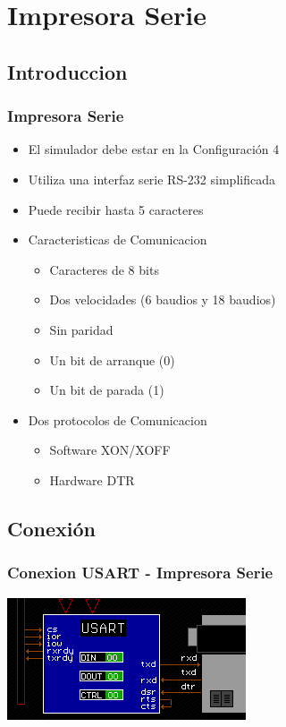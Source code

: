 \documentclass{beamer}
\begin{document}
\section{Impresora Serie}
\subsection{Introduccion}
\begin{frame}[fragile]
\frametitle{Impresora Serie}
\begin{itemize}
 \item El simulador debe estar en la Configuración 4
 \item Utiliza una interfaz serie RS-232 simplificada
 \item Puede recibir hasta 5 caracteres
 \item Caracteristicas de Comunicacion
 \begin{itemize}
  \item Caracteres de 8 bits
  \item Dos velocidades (6 baudios y 18 baudios)
  \item Sin paridad
  \item Un bit de arranque (0)
  \item Un bit de parada (1)
 \end{itemize}
  \item Dos protocolos de Comunicacion
\begin{itemize}
 \item Software XON/XOFF
 \item Hardware DTR
\end{itemize}

\end{itemize}
\end{frame}

\subsection{Conexión}
\begin{frame}[fragile]
\frametitle{Conexion USART - Impresora Serie}
\begin{center}
 \includegraphics[scale=1.00]{conexion_usart.png}
\end{center}

\end{frame}
\end{document}
